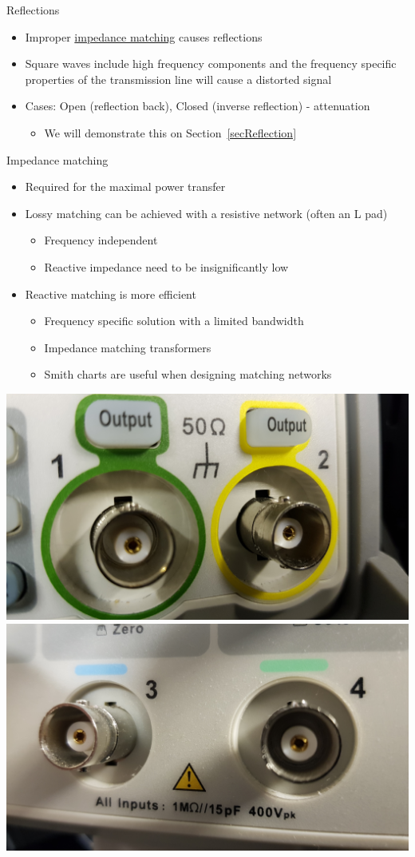 \documentclass{beamer}
\begin{document}
\begin{frame}{Reflections}
\begin{itemize}
 \item Improper \hyperlink{impedance_matching}{impedance matching} causes reflections
 \item Square waves include high frequency components and
       the frequency specific properties of the transmission line will cause a distorted signal
 \item Cases: Open (reflection back), Closed (inverse reflection) - attenuation
  \begin{itemize}
   \item We will demonstrate this on Section~\ref{secReflection}
  \end{itemize}
\end{itemize}
\end{frame}

\begin{frame}[label=impedance_matching]{Impedance matching}
\small
\begin{itemize}
 \item Required for the maximal power transfer
 \item Lossy matching can be achieved with a resistive network (often an L pad)
  \begin{itemize}
   \item Frequency independent
   \item Reactive impedance need to be insignificantly low
  \end{itemize}
 \item Reactive matching is more efficient
  \begin{itemize}
   \item Frequency specific solution with a limited bandwidth
   \item Impedance matching transformers
   \item Smith charts are useful when designing matching networks~\cite{w2aew2023}
  \end{itemize}
\end{itemize}
\includegraphics[width=0.4\linewidth]{coaxial_out.jpg}
\includegraphics[width=0.4\linewidth]{coaxial_in.jpg}
\end{frame}
\end{document}
